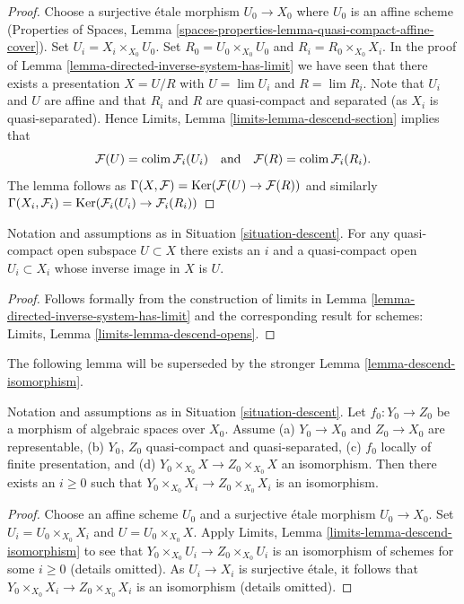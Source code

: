 \begin{proof}
Choose a surjective \'etale morphism $U_0 \to X_0$ where $U_0$ is an affine
scheme (Properties of Spaces, Lemma
\ref{spaces-properties-lemma-quasi-compact-affine-cover}).
Set $U_i = X_i \times_{X_0} U_0$.
Set $R_0 = U_0 \times_{X_0} U_0$ and $R_i = R_0 \times_{X_0} X_i$.
In the proof of Lemma \ref{lemma-directed-inverse-system-has-limit} we have
seen that there exists a presentation $X = U/R$ with
$U = \lim U_i$ and $R = \lim R_i$.
Note that $U_i$ and $U$ are affine and that $R_i$ and $R$ are
quasi-compact and separated (as $X_i$ is quasi-separated). Hence
Limits, Lemma \ref{limits-lemma-descend-section}
implies that
$$
\mathcal{F}(U) = \mathop{\mathrm{colim}}\nolimits \mathcal{F}_i(U_i)
\quad\text{and}\quad
\mathcal{F}(R) = \mathop{\mathrm{colim}}\nolimits \mathcal{F}_i(R_i).
$$
The lemma follows as
$\Gamma(X, \mathcal{F}) = \mathop{\mathrm{Ker}}(\mathcal{F}(U) \to \mathcal{F}(R))$
and similarly
$\Gamma(X_i, \mathcal{F}_i) =
\mathop{\mathrm{Ker}}(\mathcal{F}_i(U_i) \to \mathcal{F}_i(R_i))$
\end{proof}

\begin{lemma}
\label{lemma-descend-opens}
Notation and assumptions as in Situation \ref{situation-descent}.
For any quasi-compact open subspace $U \subset X$ there exists an $i$
and a quasi-compact open $U_i \subset X_i$ whose inverse image in $X$ is $U$.
\end{lemma}

\begin{proof}
Follows formally from the construction of limits in
Lemma \ref{lemma-directed-inverse-system-has-limit}
and the corresponding result for schemes:
Limits, Lemma \ref{limits-lemma-descend-opens}.
\end{proof}

\noindent
The following lemma will be superseded by the stronger
Lemma \ref{lemma-descend-isomorphism}.

\begin{lemma}
\label{lemma-descend-equality}
Notation and assumptions as in Situation \ref{situation-descent}.
Let $f_0 : Y_0 \to Z_0$ be a morphism of algebraic spaces over $X_0$.
Assume (a) $Y_0 \to X_0$ and $Z_0 \to X_0$ are representable, (b)
$Y_0$, $Z_0$ quasi-compact and quasi-separated, (c)
$f_0$ locally of finite presentation, and
(d) $Y_0 \times_{X_0} X \to Z_0 \times_{X_0} X$ an isomorphism.
Then there exists an $i \geq 0$ such that
$Y_0 \times_{X_0} X_i \to Z_0 \times_{X_0} X_i$ is an isomorphism.
\end{lemma}

\begin{proof}
Choose an affine scheme $U_0$ and a surjective \'etale morphism $U_0 \to X_0$.
Set $U_i = U_0 \times_{X_0} X_i$ and $U = U_0 \times_{X_0} X$.
Apply Limits, Lemma \ref{limits-lemma-descend-isomorphism}
to see that $Y_0 \times_{X_0} U_i \to Z_0 \times_{X_0} U_i$
is an isomorphism of schemes for some $i \geq 0$ (details omitted).
As $U_i \to X_i$ is surjective \'etale, it follows that
$Y_0 \times_{X_0} X_i \to Z_0 \times_{X_0} X_i$ is an isomorphism
(details omitted).
\end{proof}

